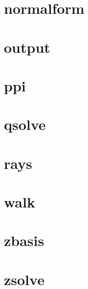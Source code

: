 {\small
}

\clearpage
\section{normalform}
\label{s:ref:normalform}

{\small
}

\clearpage
\section{output}
\label{s:ref:output}
{\small
}

\clearpage
\section{ppi}
\label{s:ref:ppi}
{\small
}

\clearpage
\section{qsolve}
\label{s:ref:qsolve}
{\small
}

\clearpage
\section{rays}
\label{s:ref:rays}
{\small
}

\clearpage
\section{walk}
\label{s:ref:walk}

{\small
}

\clearpage
\section{zbasis}
\label{s:ref:zbasis}

{\small
}

\clearpage
\section{zsolve}
\label{s:ref:zsolve}
{\small
}


